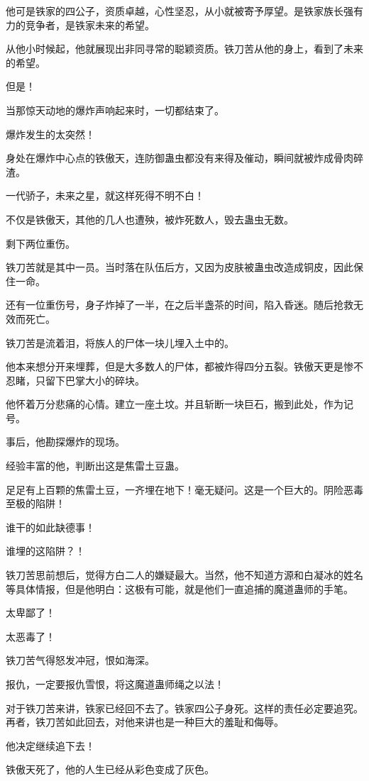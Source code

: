 \begin{this_body}
他可是铁家的四公子，资质卓越，心性坚忍，从小就被寄予厚望。是铁家族长强有力的竞争者，是铁家未来的希望。

从他小时候起，他就展现出非同寻常的聪颖资质。铁刀苦从他的身上，看到了未来的希望。

但是！

当那惊天动地的爆炸声响起来时，一切都结束了。

爆炸发生的太突然！

身处在爆炸中心点的铁傲天，连防御蛊虫都没有来得及催动，瞬间就被炸成骨肉碎渣。

一代骄子，未来之星，就这样死得不明不白！

不仅是铁傲天，其他的几人也遭殃，被炸死数人，毁去蛊虫无数。

剩下两位重伤。

铁刀苦就是其中一员。当时落在队伍后方，又因为皮肤被蛊虫改造成铜皮，因此保住一命。

还有一位重伤号，身子炸掉了一半，在之后半盏茶的时间，陷入昏迷。随后抢救无效而死亡。

铁刀苦是流着泪，将族人的尸体一块儿埋入土中的。

他本来想分开来埋葬，但是大多数人的尸体，都被炸得四分五裂。铁傲天更是惨不忍睹，只留下巴掌大小的碎块。

他怀着万分悲痛的心情。建立一座土坟。并且斩断一块巨石，搬到此处，作为记号。

事后，他勘探爆炸的现场。

经验丰富的他，判断出这是焦雷土豆蛊。

足足有上百颗的焦雷土豆，一齐埋在地下！毫无疑问。这是一个巨大的。阴险恶毒至极的陷阱！

谁干的如此缺德事！

谁埋的这陷阱？！

铁刀苦思前想后，觉得方白二人的嫌疑最大。当然，他不知道方源和白凝冰的姓名等具体情报，但是他明白：这极有可能，就是他们一直追捕的魔道蛊师的手笔。

太卑鄙了！

太恶毒了！

铁刀苦气得怒发冲冠，恨如海深。

报仇，一定要报仇雪恨，将这魔道蛊师绳之以法！

对于铁刀苦来讲，铁家已经回不去了。铁家四公子身死。这样的责任必定要追究。再者，铁刀苦如此回去，对他来讲也是一种巨大的羞耻和侮辱。

他决定继续追下去！

铁傲天死了，他的人生已经从彩色变成了灰色。


\end{this_body}
